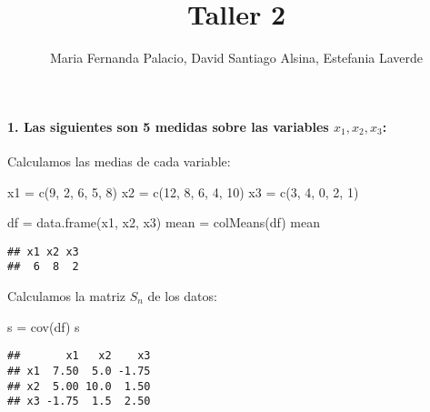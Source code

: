 \documentclass[
]{article}
\title{Taller 2}
\author{Maria Fernanda Palacio, David Santiago Alsina, Estefania
Laverde}
\date{}
\newenvironment{Shaded}{\begin{snugshade}}{\end{snugshade}}
\newcommand{\DecValTok}[1]{\textcolor[rgb]{0.00,0.00,0.81}{#1}}
\newcommand{\FunctionTok}[1]{\textcolor[rgb]{0.00,0.00,0.00}{#1}}
\newcommand{\NormalTok}[1]{#1}
\newcommand{\OtherTok}[1]{\textcolor[rgb]{0.56,0.35,0.01}{#1}}
\begin{document}
\maketitle

\hypertarget{las-siguientes-son-5-medidas-sobre-las-variables-x_1-x_2-x_3}{%
\paragraph{\texorpdfstring{1. Las siguientes son 5 medidas sobre las
variables
\(x_1, x_2, x_3\):}{1. Las siguientes son 5 medidas sobre las variables x\_1, x\_2, x\_3:}}\label{las-siguientes-son-5-medidas-sobre-las-variables-x_1-x_2-x_3}}

Calculamos las medias de cada variable:

\begin{Shaded}
\begin{Highlighting}[]
\NormalTok{x1 }\OtherTok{=} \FunctionTok{c}\NormalTok{(}\DecValTok{9}\NormalTok{, }\DecValTok{2}\NormalTok{, }\DecValTok{6}\NormalTok{, }\DecValTok{5}\NormalTok{, }\DecValTok{8}\NormalTok{)}
\NormalTok{x2 }\OtherTok{=} \FunctionTok{c}\NormalTok{(}\DecValTok{12}\NormalTok{, }\DecValTok{8}\NormalTok{, }\DecValTok{6}\NormalTok{, }\DecValTok{4}\NormalTok{, }\DecValTok{10}\NormalTok{)}
\NormalTok{x3 }\OtherTok{=} \FunctionTok{c}\NormalTok{(}\DecValTok{3}\NormalTok{, }\DecValTok{4}\NormalTok{, }\DecValTok{0}\NormalTok{, }\DecValTok{2}\NormalTok{, }\DecValTok{1}\NormalTok{)}

\NormalTok{df }\OtherTok{=} \FunctionTok{data.frame}\NormalTok{(x1, x2, x3)}
\NormalTok{mean }\OtherTok{=} \FunctionTok{colMeans}\NormalTok{(df)}
\NormalTok{mean}
\end{Highlighting}
\end{Shaded}

\begin{verbatim}
## x1 x2 x3 
##  6  8  2
\end{verbatim}

Calculamos la matriz \(S_n\) de los datos:

\begin{Shaded}
\begin{Highlighting}[]
\NormalTok{s }\OtherTok{=} \FunctionTok{cov}\NormalTok{(df)}
\NormalTok{s}
\end{Highlighting}
\end{Shaded}

\begin{verbatim}
##       x1   x2    x3
## x1  7.50  5.0 -1.75
## x2  5.00 10.0  1.50
## x3 -1.75  1.5  2.50
\end{verbatim}
\end{document}
